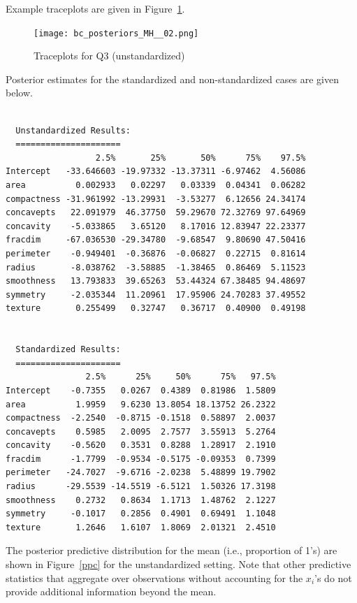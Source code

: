 \documentclass[11pt]{article}
\begin{document}
\begin{itemize}
 Example traceplots are given in Figure~\ref{tp}.
 
 \begin{figure}[h]
 \begin{center}
  \texttt{[image: bc\_posteriors\_MH\_\_02.png]}
  \caption{Traceplots for Q3 (unstandardized)}\label{tp}
 \end{center}
 \end{figure} 
 
 Posterior estimates for the standardized and non-standardized cases are given below.
 \begin{verbatim}
  
  Unstandardized Results:
  =====================
                  2.5%       25%       50%      75%    97.5%
Intercept   -33.646603 -19.97332 -13.37311 -6.97462  4.56086
area          0.002933   0.02297   0.03339  0.04341  0.06282
compactness -31.961992 -13.29931  -3.53277  6.12656 24.34174
concavepts   22.091979  46.37750  59.29670 72.32769 97.64969
concavity    -5.033865   3.65120   8.17016 12.83947 22.23377
fracdim     -67.036530 -29.34780  -9.68547  9.80690 47.50416
perimeter    -0.949401  -0.36876  -0.06827  0.22715  0.81614
radius       -8.038762  -3.58885  -1.38465  0.86469  5.11523
smoothness   13.793833  39.65263  53.44324 67.38485 94.48697
symmetry     -2.035344  11.20961  17.95906 24.70283 37.49552
texture       0.255499   0.32747   0.36717  0.40900  0.49198
  
  
  Standardized Results:
  =====================  
                2.5%      25%     50%      75%   97.5%
Intercept    -0.7355   0.0267  0.4389  0.81986  1.5809
area          1.9959   9.6230 13.8054 18.13752 26.2322
compactness  -2.2540  -0.8715 -0.1518  0.58897  2.0037
concavepts    0.5985   2.0095  2.7577  3.55913  5.2764
concavity    -0.5620   0.3531  0.8288  1.28917  2.1910
fracdim      -1.7799  -0.9534 -0.5175 -0.09353  0.7399
perimeter   -24.7027  -9.6716 -2.0238  5.48899 19.7902
radius      -29.5539 -14.5519 -6.5121  1.50326 17.3198
smoothness    0.2732   0.8634  1.1713  1.48762  2.1227
symmetry     -0.1017   0.2856  0.4901  0.69491  1.1048
texture       1.2646   1.6107  1.8069  2.01321  2.4510
 \end{verbatim}

 The posterior predictive distribution for the mean (i.e., proportion of 1's) are shown in Figure~\ref{ppc} for the unstandardized setting.
 Note that other predictive statistics that aggregate over observations without accounting for the $x_{i}$'s do not
 provide additional information beyond the mean.


\end{itemize}
\end{document}
